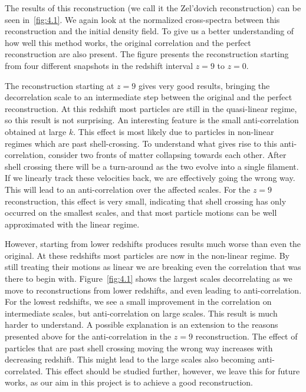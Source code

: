 The results of this reconstruction (we call it the Zel'dovich reconstruction) can be seen in~\ref{fig:4.1}. We again look at the normalized cross-spectra between this reconstruction and the initial density field. To give us a better understanding of how well this method works, the original correlation and the perfect reconstruction are also present. The figure presents the reconstruction starting from four different snapshots in the redshift interval $z=9$ to $z=0$.

The reconstruction starting at $z=9$ gives very good results, bringing the decorrelation scale to an intermediate step between the original and the perfect reconstruction. At this redshift most particles are still in the quasi-linear regime, so this result is not surprising. An interesting feature is the small anti-correlation obtained at large $k$. This effect is most likely due to particles in non-linear regimes which are past shell-crossing. To understand what gives rise to this anti-correlation, consider two fronts of matter collapsing towards each other. After shell crossing there will be a turn-around as the two evolve into a single filament. If we linearly track these velocities back, we are effectively going the wrong way. This will lead to an anti-correlation over the affected scales. For the $z=9$ reconstruction, this effect is very small, indicating that shell crossing has only occurred on the smallest scales, and that most particle motions can be well approximated with the linear regime. 

However, starting from lower redshifts produces results much worse than even the original. At these redshifts most particles are now in the non-linear regime. By still treating their motions as linear we are breaking even the correlation that was there to begin with. Figure~\ref{fig:4.1} shows the largest scales decorrelating as we move to reconstructions from lower redshifts, and even leading to anti-correlation. For the lowest redshifts, we see a small improvement in the correlation on intermediate scales, but anti-correlation on large scales. This result is much harder to understand. A possible explanation is an extension to the reasons presented above for the anti-correlation in the $z=9$ reconstruction. The effect of particles that are past shell crossing moving the wrong way increases with decreasing redshift. This might lead to the large scales also becoming anti-correlated. This effect should be studied further, however, we leave this for future works, as our aim in this project is to achieve a good reconstruction.

